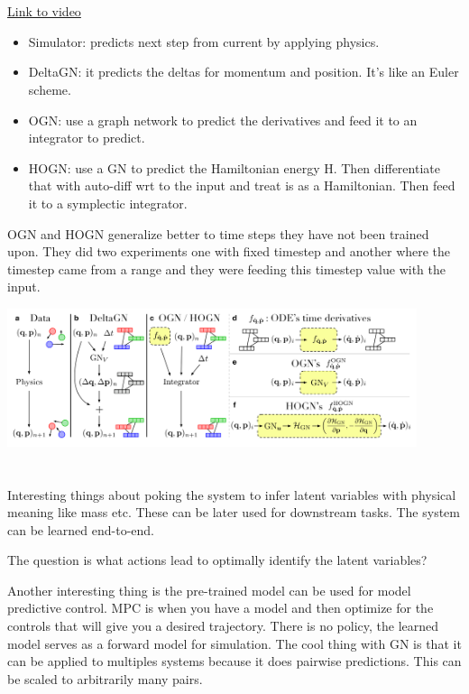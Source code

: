 \documentclass{article}
\newcommand{\citeall}[1]{\citeauthor{#1}}
\newcommand{\uls}{\begin{itemize}}
\newcommand{\ule}{\end{itemize}}
\newcommand{\li}{\item}
\begin{document}
\section{\citeall{Sanchez-Gonzalez2019HamiltonianIntegrators}}
\href{http://www.ipam.ucla.edu/abstract/?tid=16226&pcode=MLPWS2}{Link to video}

\uls
\li Simulator: predicts next step from current by applying physics.
\li DeltaGN: it predicts the deltas for momentum and position. It's like an Euler scheme.
\li OGN: use a graph network to predict the derivatives and feed it to an integrator to predict.
\li HOGN: use a GN to predict the Hamiltonian energy H. Then differentiate that with auto-diff wrt to the input and treat is as a Hamiltonian. Then feed it to a symplectic integrator.
\ule

OGN and HOGN generalize better to time steps they have not been trained upon. They did two experiments one with fixed timestep and another where the timestep came from a range and they were feeding this timestep value with the input.

\includegraphics[width=0.9\textwidth]{images/hamgraph.png}

\section{\citeall{Sanchez-Gonzalez2018GraphControl}}

Interesting things about poking the system to infer latent variables with physical meaning like mass etc. These can be later used for downstream tasks. The system can be learned end-to-end.

The question is what actions lead to optimally identify the latent variables?

Another interesting thing is the pre-trained model can be used for model predictive control. MPC is when you have a model and then optimize for the controls that will give you a desired trajectory. There is no policy, the learned model serves as a forward model for simulation. The cool thing with GN is that it can be applied to multiples systems because it does pairwise predictions. This can be scaled to arbitrarily many pairs.
\end{document}
